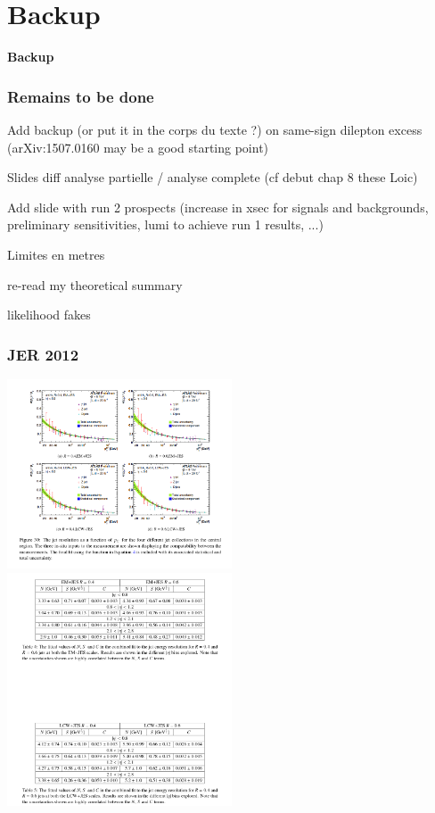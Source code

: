 \appendix

\section[]{Backup}

\begin{frame}[plain]
\begin{center}
\textbf{\Large Backup}
\end{center}
\end{frame}

\begin{frame}[plain]
\frametitle{Remains to be done}
\begin{maliste}
\item Add backup (or put it in the corps du texte ?) on same-sign dilepton excess (arXiv:1507.0160 may be a good starting point)
\item Slides diff analyse partielle / analyse complete (cf debut chap 8 these 
Loic)
\item Add slide with run 2 prospects (increase in xsec for signals and backgrounds, preliminary sensitivities, lumi to achieve run 1 results, ...)
\item Limites en metres
\item re-read my theoretical summary
\item likelihood fakes
\end{maliste}

\end{frame}

\begin{frame}
\frametitle{JER 2012}
\begin{center}
\includegraphics[width=0.5\textwidth]{Figures/JES/JERplot2012.png}
\includegraphics[width=0.5\textwidth]{Figures/JES/JERvalues2012.png}
\end{center}
\end{frame}


